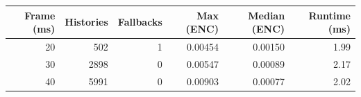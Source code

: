 \begin{tabular}{rrrrrr}\toprule
Frame (ms)&Histories&Fallbacks&Max (ENC)&Median (ENC)&Runtime (ms)\\\midrule
20 & 502 & 1 & 0.00454 & 0.00150 & 1.99 \\
30 & 2898 & 0 & 0.00547 & 0.00089 & 2.17 \\
40 & 5991 & 0 & 0.00903 & 0.00077 & 2.02 \\
\bottomrule\end{tabular}
